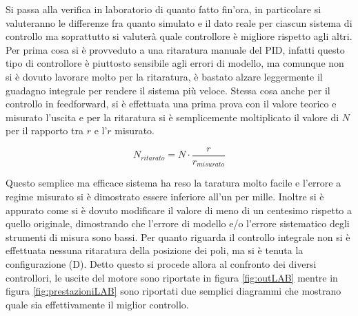 		Si passa alla verifica in laboratorio di quanto fatto fin'ora, in particolare si valuteranno le differenze fra quanto simulato e il dato reale per ciascun sistema di controllo ma soprattutto si  valuterà quale controllore è migliore rispetto agli altri. Per prima cosa si è provveduto a una ritaratura manuale del PID, infatti questo tipo di controllore è piuttosto sensibile agli errori di modello, ma comunque non si è dovuto lavorare molto per la ritaratura, è bastato alzare leggermente il guadagno integrale per rendere il sistema più veloce. Stessa cosa anche per il controllo in feedforward, si è effettuata una prima prova con il valore teorico e misurato l'uscita e per la ritaratura si è semplicemente moltiplicato il valore di $N$ per il rapporto tra $r$ e l'$r$ misurato.
		
		\begin{equation}
			N_{ritarato} = N \cdot \frac{r}{r_{misurato}}
		\end{equation}
		
		\noindent Questo semplice ma efficace sistema ha reso la taratura molto facile e l'errore a regime misurato si è dimostrato essere inferiore all'un per mille. Inoltre si è appurato come si è dovuto modificare il valore di meno di un centesimo rispetto a quello originale, dimostrando che l'errore di modello e/o l'errore sistematico degli strumenti di misura sono bassi. Per quanto riguarda il controllo integrale non si è effettuata nessuna ritaratura della posizione dei poli, ma si è tenuta la configurazione (D). Detto questo si procede allora al confronto dei diversi controllori, le uscite del motore sono riportate in figura \ref{fig:outLAB} mentre in figura \ref{fig:prestazioniLAB} sono riportati due semplici diagrammi che mostrano quale sia effettivamente il miglior controllo. 
		
